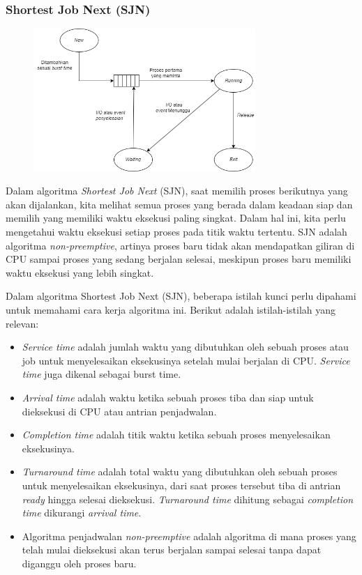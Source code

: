 \documentclass[12pt]{article}
\begin{document}
    \subsubsection{Shortest Job Next (SJN)}
    \begin{figure}[h]
    \centering
    \includegraphics[width=0.75\textwidth]{assets/SJN 2.1.png}
    \label{fig:diagram}
    \end{figure}
     \hspace{1cm} Dalam algoritma \textit{Shortest Job Next} (SJN), saat memilih proses berikutnya yang akan dijalankan, kita melihat semua proses yang berada dalam keadaan siap dan memilih yang memiliki waktu eksekusi paling singkat. Dalam hal ini, kita perlu mengetahui waktu eksekusi setiap proses pada titik waktu tertentu. SJN adalah algoritma \textit{non-preemptive}, artinya proses baru tidak akan mendapatkan giliran di CPU sampai proses yang sedang berjalan selesai, meskipun proses baru memiliki waktu eksekusi yang lebih singkat.

    \hspace{1cm} Dalam algoritma Shortest Job Next (SJN), beberapa istilah kunci perlu dipahami untuk memahami cara kerja algoritma ini. Berikut adalah istilah-istilah yang relevan: 
    
    \begin{itemize}
        \item \textit{Service time} adalah jumlah waktu yang dibutuhkan oleh sebuah proses atau job untuk menyelesaikan eksekusinya setelah mulai berjalan di CPU. \textit{Service time} juga dikenal sebagai burst time.
        \item \textit{Arrival time} adalah waktu ketika sebuah proses tiba dan siap untuk dieksekusi di CPU atau antrian penjadwalan.
        \item \textit{Completion time} adalah titik waktu ketika sebuah proses menyelesaikan eksekusinya.
        \item \textit{Turnaround time} adalah total waktu yang dibutuhkan oleh sebuah proses untuk menyelesaikan eksekusinya, dari saat proses tersebut tiba di antrian \textit{ready} hingga selesai dieksekusi. \textit{Turnaround time} dihitung sebagai \textit{completion time} dikurangi \textit{arrival time}.
        \item Algoritma penjadwalan \textit{non-preemptive} adalah  algoritma di mana proses yang telah mulai dieksekusi akan terus berjalan sampai selesai tanpa dapat diganggu oleh proses baru. 
    \end{itemize}
    
\end{document}
